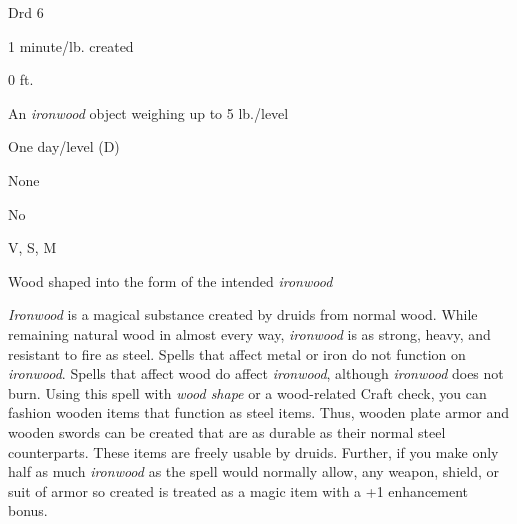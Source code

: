 
\begin{description*}
\item[Level:] Drd 6
\item[Casting Time:] 1 minute/lb. created
\item[Range:] 0 ft.
\item[Effect:] An \textit{ironwood} object weighing up to 5 lb./level
\item[Duration:] One day/level (D)
\item[Saving Throw:] None
\item[Spell Resistance:] No
\item[Components:] V, S, M
\item[Arcane Material Component:] Wood shaped into the form of the intended \textit{ironwood}
\end{description*}

\textit{Ironwood} is a magical substance created by druids from normal wood. While
remaining natural wood in almost every way, \textit{ironwood} is as strong, heavy,
and resistant to fire as steel. Spells that affect metal or iron do not function
on \textit{ironwood}. Spells that affect wood do affect \textit{ironwood}, although
\textit{ironwood} does not burn. Using this spell with \textit{wood shape} or a
wood-related Craft check, you can fashion wooden items that function as steel items.
Thus, wooden plate armor and wooden swords can be created that are as durable as
their normal steel counterparts. These items are freely usable by druids.
Further, if you make only half as much \textit{ironwood} as the spell would normally
allow, any weapon, shield, or suit of armor so created is treated as a magic item
with a +1 enhancement bonus.